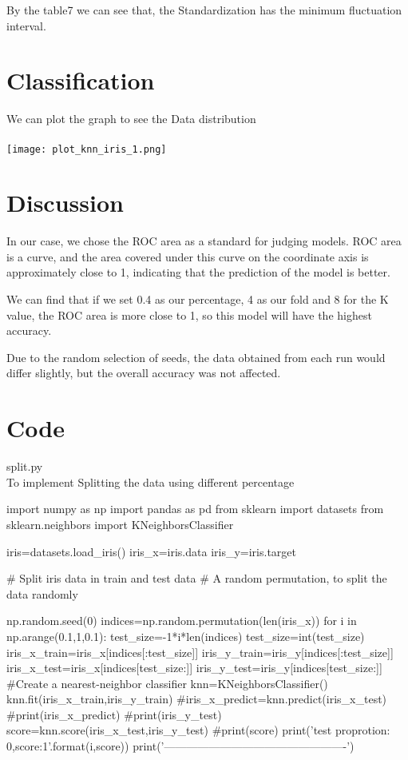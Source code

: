 \documentclass[a4pper,11pt,onecolumn]{article}
\begin{document}
By the table7 we can see that, the Standardization has the minimum fluctuation interval.

\section{Classification}

We can plot the graph to see the Data distribution
\\
\\
\texttt{[image: plot\_knn\_iris\_1.png]}


\section{Discussion}

In our case, we chose the ROC area as a standard for judging models.
ROC area is a curve, and the area covered under this curve on the coordinate axis is approximately close to 1, indicating that the prediction of the model is better.

We can find that if we set 0.4 as our percentage, 4 as our fold and 8 for the K value, the ROC area is more close to 1, so this model will have the highest accuracy.

Due to the random selection of seeds, the data obtained from each run would differ slightly, but the overall accuracy was not affected.

\section{Code}

split.py\\
To implement Splitting the data using different percentage

\begin{python}
	import numpy as np
	import pandas as pd
	from sklearn import datasets
	from sklearn.neighbors import KNeighborsClassifier
	
	iris=datasets.load_iris()
	iris_x=iris.data
	iris_y=iris.target
	
	# Split iris data in train and test data
	# A random permutation, to split the data randomly
	
	np.random.seed(0)
	indices=np.random.permutation(len(iris_x))
	for i in np.arange(0.1,1,0.1):
	test_size=-1*i*len(indices)
	test_size=int(test_size)
	iris_x_train=iris_x[indices[:test_size]]
	iris_y_train=iris_y[indices[:test_size]]
	iris_x_test=iris_x[indices[test_size:]]
	iris_y_test=iris_y[indices[test_size:]]
	#Create a nearest-neighbor classifier
	knn=KNeighborsClassifier()
	knn.fit(iris_x_train,iris_y_train)
	#iris_x_predict=knn.predict(iris_x_test)
	#print(iris_x_predict)
	#print(iris_y_test)
	score=knn.score(iris_x_test,iris_y_test)
	#print(score)
	print('test proprotion: {0},\nevaluate score:{1}'.format(i,score))
	print('-------------------------------------------------')
\end{python}
\end{document}
